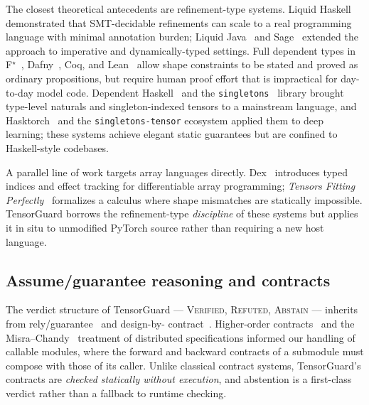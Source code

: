 The closest theoretical antecedents are refinement-type systems.
Liquid Haskell~\citep{vazou2014liquidhaskell,vazou2017refinement}
demonstrated that SMT-decidable refinements can scale to a real
programming language with minimal annotation burden; Liquid
Java~\citep{rondon2012liquidjava} and Sage~\citep{flanagan2006sage}
extended the approach to imperative and dynamically-typed settings.
Full dependent types in F$^\star$~\citep{swamy2016dependent},
Dafny~\citep{leino2010dafny}, Coq, and Lean~\citep{moura2021lean4}
allow shape constraints to be stated and proved as ordinary
propositions, but require human proof effort that is impractical for
day-to-day model code. Dependent
Haskell~\citep{eisenberg2016dependent} and the
\texttt{singletons}~\citep{eisenberg2012singletons} library brought
type-level naturals and singleton-indexed tensors to a mainstream
language, and Hasktorch~\citep{hasktorch} and the
\texttt{singletons-tensor} ecosystem applied them to deep learning;
these systems achieve elegant static guarantees but are confined to
Haskell-style codebases.

A parallel line of work targets array languages directly.
Dex~\citep{paszke2019dex,maclaurin2019dex} introduces typed indices
and effect tracking for differentiable array programming; \emph{Tensors
Fitting Perfectly}~\citep{rink2018tensors} formalizes a calculus where
shape mismatches are statically impossible. TensorGuard borrows the
refinement-type \emph{discipline} of these systems but applies it in
situ to unmodified PyTorch source rather than requiring a new host
language.

\subsection{Assume/guarantee reasoning and contracts}

The verdict structure of TensorGuard --- \textsc{Verified},
\textsc{Refuted}, \textsc{Abstain} --- inherits from
rely/guarantee~\citep{jones1983ar} and design-by-
contract~\citep{meyer1992contracts}. Higher-order
contracts~\citep{findler2002higherorder} and the
Misra--Chandy~\citep{misra1981proofs} treatment of distributed
specifications informed our handling of callable modules, where the
forward and backward contracts of a submodule must compose with those
of its caller. Unlike classical contract systems, TensorGuard's
contracts are \emph{checked statically without execution}, and
abstention is a first-class verdict rather than a fallback to
runtime checking.

